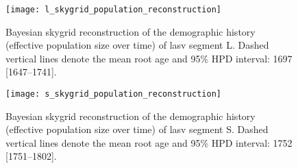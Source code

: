 \begin{figure}[ht]
  \centering
  \medskip
  \texttt{[image: l\_skygrid\_population\_reconstruction]}
  \caption[Demographic history of Lassa's L segment]{Bayesian skygrid reconstruction of the demographic history (effective population size over time) of \gls{lasv} segment L. Dashed vertical lines denote the mean root age and 95\% HPD interval: 1697 [1647--1741].}
  \label{fig:l_skygrid}
\end{figure}

\begin{figure}[ht]
  \centering
  \medskip
  \texttt{[image: s\_skygrid\_population\_reconstruction]}
  \caption[Demographic history of Lassa's S segment]{Bayesian skygrid reconstruction of the demographic history (effective population size over time) of \gls{lasv} segment S. Dashed vertical lines denote the mean root age and 95\% HPD interval: 1752 [1751--1802].}
  \label{fig:s_skygrid}
\end{figure}


\cleardoublepage

